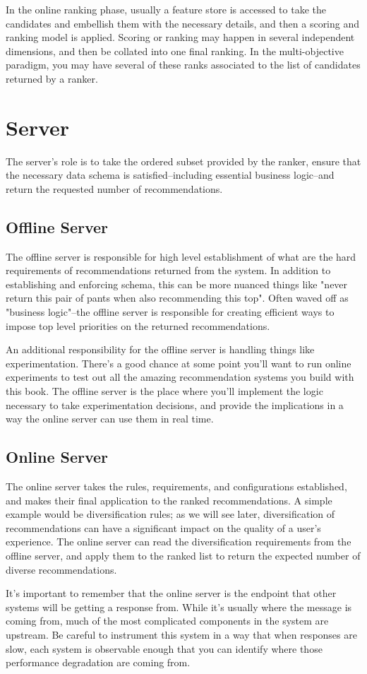 In the online ranking phase, usually a feature store is accessed to take the candidates and embellish them with the necessary details, and then a scoring and ranking model is applied. Scoring or ranking may happen in several independent dimensions, and then be collated into one final ranking. In the multi-objective paradigm, you may have several of these ranks associated to the list of candidates returned by a ranker.

\section{Server}

The server's role is to take the ordered subset provided by the ranker, ensure that the necessary data schema is satisfied–including essential business logic–and return the requested number of recommendations. 

\subsection{Offline Server}

The offline server is responsible for high level establishment of what are the hard requirements of recommendations returned from the system. In addition to establishing and enforcing schema, this can be more nuanced things like "never return this pair of pants when also recommending this top". Often waved off as "business logic"–the offline server is responsible for creating efficient ways to impose top level priorities on the returned recommendations. 

An additional responsibility for the offline server is handling things like experimentation. There's a good chance at some point you'll want to run online experiments to test out all the amazing recommendation systems you build with this book. The offline server is the place where you'll implement the logic necessary to take experimentation decisions, and provide the implications in a way the online server can use them in real time.

\subsection{Online Server}

The online server takes the rules, requirements, and configurations established, and makes their final application to the ranked recommendations. A simple example would be diversification rules; as we will see later, diversification of recommendations can have a significant impact on the quality of a user's experience. The online server can read the diversification requirements from the offline server, and apply them to the ranked list to return the expected number of diverse recommendations.

It's important to remember that the online server is the endpoint that other systems will be getting a response from. While it's usually where the message is coming from, much of the most complicated components in the system are upstream. Be careful to instrument this system in a way that when responses are slow, each system is observable enough that you can identify where those performance degradation are coming from.